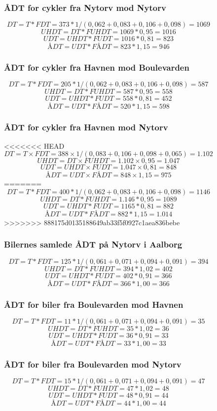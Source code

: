 \begin{figure}[htbp]
\subsubsection{ÅDT for cykler fra Nytorv mod Nytorv}
$$DT = T * FDT = 373 * 1/(0,062 +0,083+0,106+0,098) = 1069$$
$$UHDT = DT * FUHDT = 1069 * 0,95 = 1016$$
$$UDT = UHDT * FUDT = 1016 * 0,81 = 823$$
$$ÅDT = UDT * FÅDT = 823 * 1,15 = 946$$
\subsubsection{ÅDT for cykler fra Havnen mod Boulevarden}
$$DT = T * FDT = 205* 1/(0,062 +0,083+0,106+0,098) = 587$$
$$UHDT = DT * FUHDT = 587 * 0,95 = 558$$
$$UDT = UHDT * FUDT = 558 * 0,81 = 452$$
$$ÅDT = UDT * FÅDT = 520 * 1,15 = 598$$
\subsubsection{ÅDT for cykler fra Havnen mod Nytorv}
<<<<<<< HEAD
$$DT = T \times FDT = 388 \times 1/(0,083+0,106+0,098+0,065) = 1.102$$
$$UHDT = DT \times FUHDT = 1.102 \times 0,95 = 1.047$$
$$UDT = UHDT \times FUDT = 1.047 \times 0,81 = 848$$
$$ÅDT = UDT \times FÅDT = 848 \times 1,15 = 975$$
=======
$$DT = T * FDT = 400* 1/(0,062 +0,083+0,106+0,098)  = 1146$$
$$UHDT = DT * FUHDT = 1.146 * 0,95 = 1089$$
$$UDT = UHDT * FUDT = 1165 * 0,81 = 882$$
$$ÅDT = UDT * FÅDT = 882 * 1,15 = 1.014$$
>>>>>>> 888175d0135188649ab33f5f0927c1aea836bebe
\subsubsection{Bilernes samlede ÅDT på Nytorv i Aalborg}
$$DT = T * FDT = 125 * 1/(0,061+0,071+0,094+0,091) = 394$$
$$UHDT = DT * FUHDT = 394 * 1,02 = 402$$
$$UDT = UHDT * FUDT = 402 * 0,91 = 366$$
$$ÅDT = UDT * FÅDT = 366 * 1,00 = 366$$
\subsubsection{ÅDT for biler fra Boulevarden mod Havnen}
$$DT = T * FDT = 11 * 1/(0,061+0,071+0,094+0,091) = 35$$
$$UHDT = DT * FUHDT = 35 * 1,02 = 36$$
$$UDT = UHDT * FUDT = 36 * 0,91 = 33$$
$$ÅDT = UDT * FÅDT = 33 * 1,00 = 33$$
\subsubsection{ÅDT for biler fra Boulevarden mod Nytorv}
$$DT = T * FDT = 15 * 1/(0,061+0,071+0,094+0,091) = 47$$
$$UHDT = DT * FUHDT = 47 * 1,02 = 48$$
$$UDT = UHDT * FUDT = 48 * 0,91 = 44$$
$$ÅDT = UDT * FÅDT = 44 * 1,00 = 44$$

\end{figure}

